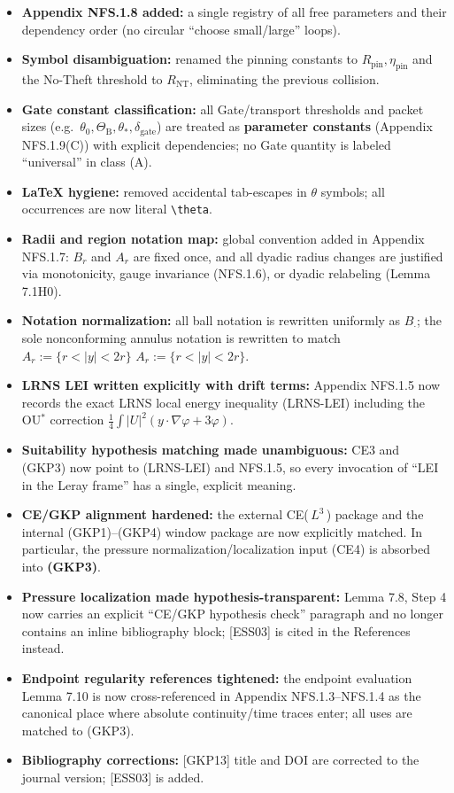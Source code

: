 \documentclass[
  11pt,
]{article}
\begin{document}
\begin{itemize}
\item
  \textbf{Appendix NFS.1.8 added:} a single registry of all free parameters and their dependency order (no circular ``choose small/large'' loops).
\item
  \textbf{Symbol disambiguation:} renamed the pinning constants to \(R_{\mathrm{pin}},\eta_{\mathrm{pin}}\) and the No-Theft threshold to \(R_{\mathrm{NT}}\), eliminating the previous collision.
\item
  \textbf{Gate constant classification:} all Gate/transport thresholds and packet sizes (e.g.~\(\theta_0,\Theta_{\mathrm{B}},\theta_*,\delta_{\mathrm{gate}}\)) are treated as \textbf{parameter constants} (Appendix NFS.1.9(C)) with explicit dependencies; no Gate quantity is labeled ``universal'' in class (A).
\item
  \textbf{LaTeX hygiene:} removed accidental tab-escapes in \(\theta\) symbols; all occurrences are now literal \texttt{\textbackslash{}theta}.
\item
  \textbf{Radii and region notation map:} global convention added in Appendix NFS.1.7: \(B_r\) and \(A_r\) are fixed once, and all dyadic radius changes are justified via monotonicity, gauge invariance (NFS.1.6), or dyadic relabeling (Lemma 7.1H0).
\item
  \textbf{Notation normalization:} all ball notation is rewritten uniformly as \(B_{\cdot}\); the sole nonconforming annulus notation is rewritten to match \(A_r:=\{r<|y|<2r\}\) \(A_r:=\{r<|y|<2r\}\).
\item
  \textbf{LRNS LEI written explicitly with drift terms:} Appendix NFS.1.5 now records the exact LRNS local energy inequality (LRNS-LEI) including the OU\(^\ast\) correction \(\tfrac14\int |U|^2(y\cdot\nabla\varphi+3\varphi)\).
\item
  \textbf{Suitability hypothesis matching made unambiguous:} CE3 and (GKP3) now point to (LRNS-LEI) and NFS.1.5, so every invocation of ``LEI in the Leray frame'' has a single, explicit meaning.
\item
  \textbf{CE/GKP alignment hardened:} the external CE(\,\(L^3\)\,) package and the internal (GKP1)--(GKP4) window package are now explicitly matched. In particular, the pressure normalization/localization input (CE4) is absorbed into \textbf{(GKP3)}.
\item
  \textbf{Pressure localization made hypothesis-transparent:} Lemma 7.8, Step 4 now carries an explicit ``CE/GKP hypothesis check'' paragraph and no longer contains an inline bibliography block; {[}ESS03{]} is cited in the References instead.
\item
  \textbf{Endpoint regularity references tightened:} the endpoint evaluation Lemma 7.10 is now cross-referenced in Appendix NFS.1.3--NFS.1.4 as the canonical place where absolute continuity/time traces enter; all uses are matched to (GKP3).
\item
  \textbf{Bibliography corrections:} {[}GKP13{]} title and DOI are corrected to the journal version; {[}ESS03{]} is added.
\end{itemize}
\end{document}

